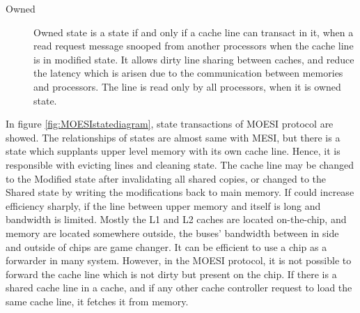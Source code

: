 \begin{description}
\item[Owned] Owned state is a state if and only if a cache line can transact in it, when a read request message snooped from another processors when the cache line is in modified state. It allows dirty line sharing between caches, and reduce the latency which is arisen due to the communication between memories and processors. The line is read only by all processors, when it is owned state.
\end{description}

In figure \ref{fig:MOESIstatediagram}, state transactions of MOESI protocol are showed. The relationships of states are almost same with MESI, but there is a state which supplants upper level memory with its own cache line. Hence, it is responsible with evicting lines and cleaning state. The cache line may be changed to the Modified state after invalidating all shared copies, or changed to the Shared state by writing the modifications back to main memory. If could increase efficiency sharply, if the line between upper memory and itself is long and bandwidth is limited. Mostly the L1 and L2 caches are located on-the-chip, and memory are located somewhere outside, the buses' bandwidth between in side and outside of chips are game changer. It can be efficient to use a chip as a forwarder in many system. However, in the MOESI protocol, it is not possible to forward the cache line which is not dirty but present on the chip. If there is a shared cache line in a cache, and if any other cache controller request to load the same cache line, it fetches it from memory.


